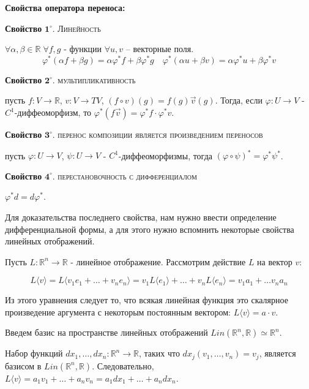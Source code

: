 \documentclass[a5paper]{article}
\theoremstyle{plain}
\theoremstyle{definition}
\numberwithin{through}{section}
\numberwithin{equation}{section}
\begin{document}
{\bf Свойства оператора переноса:}

\medskip
{\bf Свойство} $\mathbf{1^\circ.}$
{\textsc{Линейность}}

 $\forall \alpha, \beta \in \mathbb{R} \; \forall f, g$ - функции $\forall u, v$ -- векторные поля.	
	\begin{equation*}
		\varphi^{*}(\alpha f + \beta g)=\alpha\varphi^{*}f + \beta\varphi^{*}g \quad \varphi^{*}(\alpha u + \beta v) = \alpha \varphi^{*}u + \beta\varphi^{*}v
	\end{equation*}
	
\medskip
{\bf Свойство} $\mathbf{2^\circ.}$
{\textsc{мультипликативность}}

 пусть $f : V \to \mathbb{R}$, $v : V \to TV$, $(f \circ v)(g)=f(g)\vec{v}(g)$. Тогда, если $\varphi : U \to V$ - $C^1$-диффеоморфизм, то $\varphi^{*}(f \vec{v})=\varphi^{*}f \cdot \varphi^{*}v$.
	
\medskip
{\bf Свойство} $\mathbf{3^\circ.}$
{\textsc{перенос композиции является произведением переносов}}

	пусть $\varphi : U \to V$, $\psi : U \to V$ - $C^1$-диффеоморфизмы, тогда $(\varphi \circ \psi)^{*}=\varphi^{*} \psi^{*}$.
	
	\medskip
	{\bf Свойство} $\mathbf{4^\circ.}$
	{\textsc{перестановочность с дифференциалом}}
	
	$\varphi^{*}d=d \varphi^{*}$.
	


Для доказательства последнего свойства, нам нужно ввести определение дифференциальной формы, а для этого нужно вспомнить некоторые свойства линейных отображений.

Пусть $L : \mathbb{R}^n \to \mathbb{R}$ - линейное отображение. Рассмотрим действие $L$ на вектор $v$:

\begin{equation*}
	L\langle v \rangle = L \langle v_1 e_1 + \ldots + v_n e_n \rangle = v_1 L\langle e_1 \rangle + \ldots + v_n L\langle e_n \rangle = v_1 a_1 + \ldots v_n a_n
\end{equation*}

Из этого уравнения следует то, что всякая линейная функция это скалярное произведение аргумента с некоторым постоянным вектором: $L \langle v \rangle = a \cdot v$.

Введем базис на пространстве линейных отображений $Lin(\mathbb{R}^n, \mathbb{R}) \simeq \mathbb{R}^n$. 

Набор функций $dx_1, \ldots, dx_n : \mathbb{R}^n \to \mathbb{R}$, таких что $dx_j(v_1, \ldots, v_n)=v_j$, является базисом в $Lin(\mathbb{R}^n, \mathbb{R})$. Следовательно, $L \langle v \rangle = a_1 v_1 + \ldots + a_n v_n = a_1 dx_1 + \ldots + a_n dx_n$.
\end{document}
